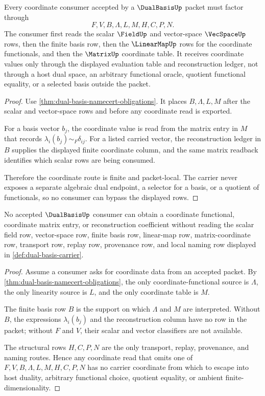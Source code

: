 \begin{theorem}
\label{thm:dual-basis-coordinate-readback}
Every coordinate consumer accepted by a $\DualBasisUp$ packet must factor through
$$
F,V,B,\Lambda,L,M,H,C,P,N.
$$
The consumer first reads the scalar $\FieldUp$ and vector-space $\VecSpaceUp$ rows, then the finite basis row, then the $\LinearMapUp$ rows for the coordinate functionals, and then the $\MatrixUp$ coordinate table. It receives coordinate values only through the displayed evaluation table and reconstruction ledger, not through a host dual space, an arbitrary functional oracle, quotient functional equality, or a selected basis outside the packet.
\end{theorem}
\begin{proof}
Use \autoref{thm:dual-basis-namecert-obligations}. It places $B,\Lambda,L,M$ after the scalar and vector-space rows and before any coordinate read is exported.

For a basis vector $b_j$, the coordinate value is read from the matrix entry in $M$ that records $\lambda_i(b_j)\sim_F\delta_{ij}$. For a listed carried vector, the reconstruction ledger in $B$ supplies the displayed finite coordinate column, and the same matrix readback identifies which scalar rows are being consumed.

Therefore the coordinate route is finite and packet-local. The carrier never exposes a separate algebraic dual endpoint, a selector for a basis, or a quotient of functionals, so no consumer can bypass the displayed rows.
\end{proof}

\begin{theorem}
\label{thm:dual-basis-nonescape}
No accepted $\DualBasisUp$ consumer can obtain a coordinate functional, coordinate matrix entry, or reconstruction coefficient without reading the scalar field row, vector-space row, finite basis row, linear-map row, matrix-coordinate row, transport row, replay row, provenance row, and local naming row displayed in \autoref{def:dual-basis-carrier}.
\end{theorem}
\begin{proof}
Assume a consumer asks for coordinate data from an accepted packet. By \autoref{thm:dual-basis-namecert-obligations}, the only coordinate-functional source is $\Lambda$, the only linearity source is $L$, and the only coordinate table is $M$.

The finite basis row $B$ is the support on which $\Lambda$ and $M$ are interpreted. Without $B$, the expressions $\lambda_i(b_j)$ and the reconstruction column have no row in the packet; without $F$ and $V$, their scalar and vector classifiers are not available.

The structural rows $H,C,P,N$ are the only transport, replay, provenance, and naming routes. Hence any coordinate read that omits one of $F,V,B,\Lambda,L,M,H,C,P,N$ has no carrier coordinate from which to escape into host duality, arbitrary functional choice, quotient equality, or ambient finite-dimensionality.
\end{proof}

